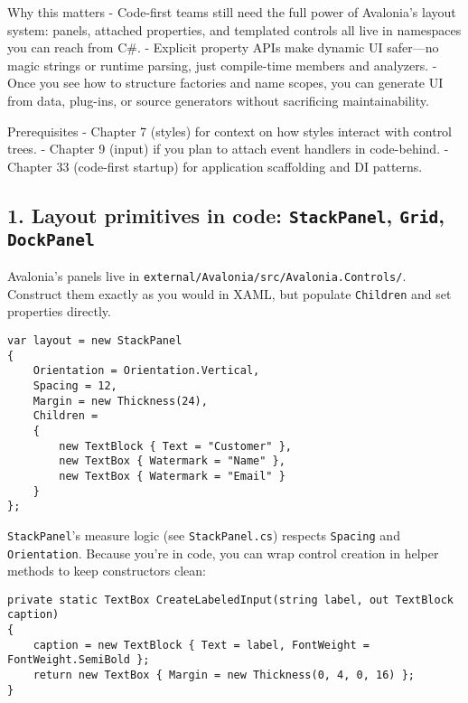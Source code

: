 Why this matters - Code-first teams still need the full power of
Avalonia's layout system: panels, attached properties, and templated
controls all live in namespaces you can reach from C\#. - Explicit
property APIs make dynamic UI safer---no magic strings or runtime
parsing, just compile-time members and analyzers. - Once you see how to
structure factories and name scopes, you can generate UI from data,
plug-ins, or source generators without sacrificing maintainability.

Prerequisites - Chapter 7 (styles) for context on how styles interact
with control trees. - Chapter 9 (input) if you plan to attach event
handlers in code-behind. - Chapter 33 (code-first startup) for
application scaffolding and DI patterns.

\subsection{\texorpdfstring{1. Layout primitives in code:
\texttt{StackPanel}, \texttt{Grid},
\texttt{DockPanel}}{1. Layout primitives in code: StackPanel, Grid, DockPanel}}\label{layout-primitives-in-code-stackpanel-grid-dockpanel}

Avalonia's panels live in
\passthrough{\lstinline!external/Avalonia/src/Avalonia.Controls/!}.
Construct them exactly as you would in XAML, but populate
\passthrough{\lstinline!Children!} and set properties directly.

\begin{lstlisting}
var layout = new StackPanel
{
    Orientation = Orientation.Vertical,
    Spacing = 12,
    Margin = new Thickness(24),
    Children =
    {
        new TextBlock { Text = "Customer" },
        new TextBox { Watermark = "Name" },
        new TextBox { Watermark = "Email" }
    }
};
\end{lstlisting}

\passthrough{\lstinline!StackPanel!}'s measure logic (see
\passthrough{\lstinline!StackPanel.cs!}) respects
\passthrough{\lstinline!Spacing!} and
\passthrough{\lstinline!Orientation!}. Because you're in code, you can
wrap control creation in helper methods to keep constructors clean:

\begin{lstlisting}
private static TextBox CreateLabeledInput(string label, out TextBlock caption)
{
    caption = new TextBlock { Text = label, FontWeight = FontWeight.SemiBold };
    return new TextBox { Margin = new Thickness(0, 4, 0, 16) };
}
\end{lstlisting}

